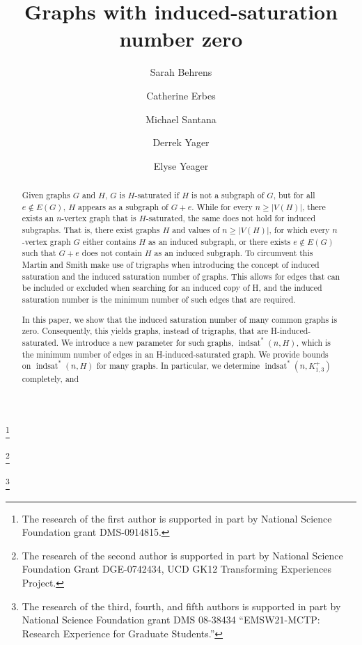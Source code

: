 \documentclass[12pt]{amsart}
\theoremstyle{plain}
\theoremstyle{definition}
\theoremstyle{remark}
\newcommand{\sis}[2]{\ensuremath{{\operatorname{indsat}}^*(#1,#2)}\xspace}
\newcommand{\claw}{\ensuremath{K_{1,3}}\xspace}
\newcommand{\paw}{\ensuremath{K_{1,3}^+}\xspace}
\begin{document}
\title{Graphs with induced-saturation number zero}

\author[S. Behrens]{Sarah Behrens}
\address[S. Behrens]{University of Nebraska-Lincoln}
\thanks{The research of the first author is supported in part by National Science Foundation grant DMS-0914815.}

\author[C. Erbes]{Catherine Erbes}
\address[C. Erbes]{Hiram College}
\thanks{The research of the second author is supported in part by National Science Foundation Grant DGE-0742434, UCD GK12 Transforming Experiences Project.}

\author[M. Santana]{Michael Santana}
\address[M. Santana, D. Yager, and E. Yeager]{University of Illinois at Urbana-Champaign}
\thanks{The research of the third, fourth, and fifth authors is supported in part by National Science Foundation grant DMS 08-38434 ``EMSW21-MCTP: Research Experience for Graduate Students.''}

\author[D. Yager]{Derrek Yager}

\author[E. Yeager]{Elyse Yeager}


\begin{abstract}
Given graphs $G$ and $H$, $G$ is $H$-saturated if $H$ is not a subgraph of $G$, but for all $e \notin E(G)$, $H$ appears as a subgraph of $G + e$.  While for every $n \ge |V(H)|$, there exists an $n$-vertex graph that is $H$-saturated, the same does not hold for induced subgraphs.  That is, there exist graphs $H$ and values of $n \ge |V(H)|$, for which every $n$-vertex graph $G$ either contains $H$ as an induced subgraph, or there exists $e \notin E(G)$ such that $G + e$ does not contain $H$ as an induced subgraph.  To circumvent this Martin and Smith \cite{MS} make use of trigraphs when introducing the concept of induced saturation and the induced saturation number of graphs. This allows for edges that can be included or excluded when searching for an induced copy of H, and the induced saturation number is the minimum number of such edges that are required.

In this paper, we show that the induced saturation number of many common graphs is zero.  Consequently, this yields graphs, instead of trigraphs, that are H-induced-saturated. We introduce a new parameter for such graphs, $\sis{n}{H}$, which is the minimum number of edges in an H-induced-saturated graph.  We provide bounds on $\sis{n}{H}$ for many graphs. In particular, we determine $\sis{n}{\paw}$ completely, and \iftoggle{sub}{$\sis{n}{\claw}$ within an additive constant of four.}{$\sis{n}{\claw}$ for infinitely many n.}
\end{abstract}
\end{document}
